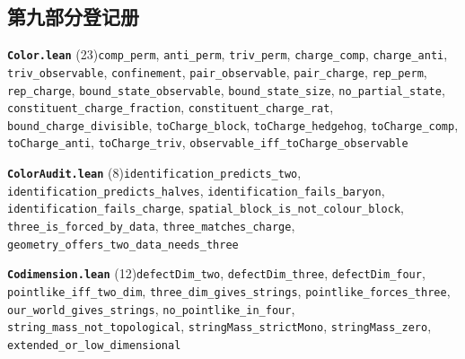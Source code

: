 \documentclass[11pt,a4paper]{article}
\theoremstyle{sudef}
\begin{document}
\subsection*{第九部分\quad 登记册}
\noindent\textbf{\texttt{Color.lean}} (23)\quad \texttt{comp\_\allowbreak perm}, \texttt{anti\_\allowbreak perm}, \texttt{triv\_\allowbreak perm}, \texttt{charge\_\allowbreak comp}, \texttt{charge\_\allowbreak anti}, \texttt{triv\_\allowbreak observable}, \texttt{confinement}, \texttt{pair\_\allowbreak observable}, \texttt{pair\_\allowbreak charge}, \texttt{rep\_\allowbreak perm}, \texttt{rep\_\allowbreak charge}, \texttt{bound\_\allowbreak state\_\allowbreak observable}, \texttt{bound\_\allowbreak state\_\allowbreak size}, \texttt{no\_\allowbreak partial\_\allowbreak state}, \texttt{constituent\_\allowbreak charge\_\allowbreak fraction}, \texttt{constituent\_\allowbreak charge\_\allowbreak rat}, \texttt{bound\_\allowbreak charge\_\allowbreak divisible}, \texttt{toCharge\_\allowbreak block}, \texttt{toCharge\_\allowbreak hedgehog}, \texttt{toCharge\_\allowbreak comp}, \texttt{toCharge\_\allowbreak anti}, \texttt{toCharge\_\allowbreak triv}, \texttt{observable\_\allowbreak iff\_\allowbreak toCharge\_\allowbreak observable}\par\smallskip
\noindent\textbf{\texttt{ColorAudit.lean}} (8)\quad \texttt{identification\_\allowbreak predicts\_\allowbreak two}, \texttt{identification\_\allowbreak predicts\_\allowbreak halves}, \texttt{identification\_\allowbreak fails\_\allowbreak baryon}, \texttt{identification\_\allowbreak fails\_\allowbreak charge}, \texttt{spatial\_\allowbreak block\_\allowbreak is\_\allowbreak not\_\allowbreak colour\_\allowbreak block}, \texttt{three\_\allowbreak is\_\allowbreak forced\_\allowbreak by\_\allowbreak data}, \texttt{three\_\allowbreak matches\_\allowbreak charge}, \texttt{geometry\_\allowbreak offers\_\allowbreak two\_\allowbreak data\_\allowbreak needs\_\allowbreak three}\par\smallskip
\noindent\textbf{\texttt{Codimension.lean}} (12)\quad \texttt{defectDim\_\allowbreak two}, \texttt{defectDim\_\allowbreak three}, \texttt{defectDim\_\allowbreak four}, \texttt{pointlike\_\allowbreak iff\_\allowbreak two\_\allowbreak dim}, \texttt{three\_\allowbreak dim\_\allowbreak gives\_\allowbreak strings}, \texttt{pointlike\_\allowbreak forces\_\allowbreak three}, \texttt{our\_\allowbreak world\_\allowbreak gives\_\allowbreak strings}, \texttt{no\_\allowbreak pointlike\_\allowbreak in\_\allowbreak four}, \texttt{string\_\allowbreak mass\_\allowbreak not\_\allowbreak topological}, \texttt{stringMass\_\allowbreak strictMono}, \texttt{stringMass\_\allowbreak zero}, \texttt{extended\_\allowbreak or\_\allowbreak low\_\allowbreak dimensional}\par\smallskip
\end{document}
